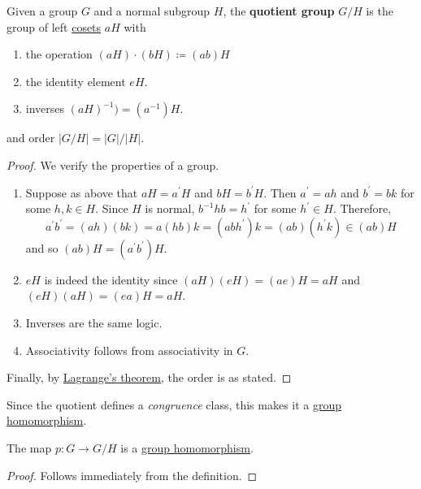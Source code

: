   \begin{definition}
    \label{def:quotient-group}
    Given a group $G$ and a normal subgroup $H$, the \textbf{quotient group} $G/H$ is the group of left \hyperref[def:coset]{cosets} $aH$ with 
    \begin{enumerate}
      \item the operation $(aH) \cdot (bH) \coloneqq (ab)H$ 
      \item the identity element $eH$. 
      \item inverses $(aH)^{-1}) = (a^{-1})H$. 
    \end{enumerate}
    and order $|G/H| = |G| / |H|$.  
  \end{definition}
  \begin{proof}
    We verify the properties of a group. 
    \begin{enumerate}
      \item Suppose as above that $aH = a^\prime H$ and $bH = b^\prime H$. Then $a^\prime = ah$ and $b^\prime = bk$ for some $h, k \in H$. Since $H$ is normal, $b^{-1} h b = h^\prime$ for some $h^\prime \in H$. Therefore, 
      \begin{equation}
        a^\prime b^\prime = (ah) (bk) = a(hb) k = (ab h^\prime) k = (ab)(h^\prime k) \in (ab) H
      \end{equation}
      and so $(ab)H = (a^\prime b^\prime)H$. 

      \item $eH$ is indeed the identity since $(aH)(eH) = (ae)H = aH$ and $(eH)(aH) = (ea)H = aH$. 
      \item Inverses are the same logic. 
      \item Associativity follows from associativity in $G$. 
    \end{enumerate}
    Finally, by \hyperref[thm:lagranges-theorem]{Lagrange's theorem}, the order is as stated. 
  \end{proof}

  Since the quotient defines a \textit{congruence} class, this makes it a \hyperref[def:group-homomorphism]{group homomorphism}. 

  \begin{theorem}
    \label{thm:quotient-maps-are-homomorphisms}
    The map $p: G \rightarrow G/H$ is a \hyperref[def:group-homomorphism]{group homomorphism}. 
  \end{theorem}
  \begin{proof}
    Follows immediately from the definition. 
  \end{proof} 

